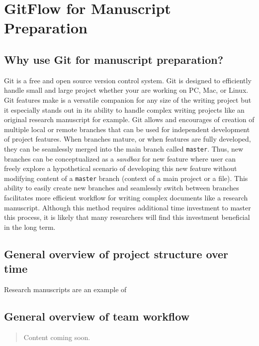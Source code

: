 \documentclass[]{book}
\begin{document}
\chapter{GitFlow for Manuscript
Preparation}\label{gitflow-for-manuscript-preparation}

\section{Why use Git for manuscript
preparation?}\label{why-use-git-for-manuscript-preparation}

Git is a free and open source version control system. Git is designed to
efficiently handle small and large project whether your are working on
PC, Mac, or Linux. Git features make is a versatile companion for any
size of the writing project but it especially stands out in its ability
to handle complex writing projects like an original research manuscript
for example. Git allows and encourages of creation of multiple local or
remote branches that can be used for independent development of project
features. When branches mature, or when features are fully developed,
they can be seamlessly merged into the main branch called
\texttt{master}. Thus, new branches can be conceptualized as a
\emph{sandbox} for new feature where user can freely explore a
hypothetical scenario of developing this new feature without modifying
content of a \texttt{master} branch (context of a main project or a
file). This ability to easily create new branches and seamlessly switch
between branches facilitates more efficient workflow for writing complex
documents like a research manuscript. Although this method requires
additional time investment to master this process, it is likely that
many researchers will find this investment beneficial in the long term.

\section{General overview of project structure over
time}\label{general-overview-of-project-structure-over-time}

Research manuscripts are an example of

\section{General overview of team
workflow}\label{general-overview-of-team-workflow}

\begin{quote}
Content coming soon.
\end{quote}
\end{document}
